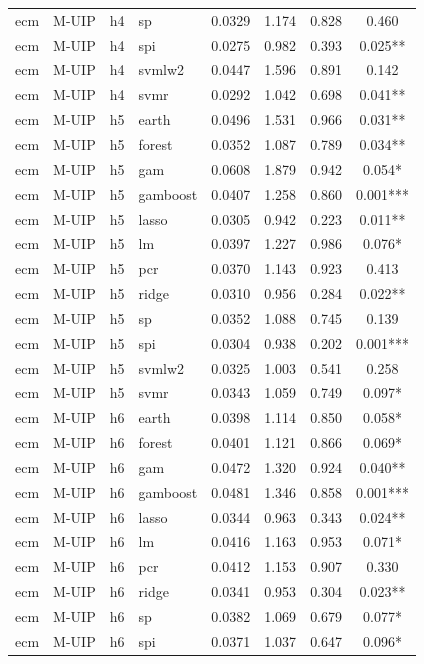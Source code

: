 \begin{ThreePartTable}
\begin{longtable}[t]{llclcccc}
ecm & M-UIP & h4 & sp & 0.0329 & 1.174 & 0.828 & 0.460\\
ecm & M-UIP & h4 & spi & 0.0275 & 0.982 & 0.393 & 0.025**\\
ecm & M-UIP & h4 & svmlw2 & 0.0447 & 1.596 & 0.891 & 0.142\\
ecm & M-UIP & h4 & svmr & 0.0292 & 1.042 & 0.698 & 0.041**\\
\addlinespace
ecm & M-UIP & h5 & earth & 0.0496 & 1.531 & 0.966 & 0.031**\\
ecm & M-UIP & h5 & forest & 0.0352 & 1.087 & 0.789 & 0.034**\\
ecm & M-UIP & h5 & gam & 0.0608 & 1.879 & 0.942 & 0.054*\\
ecm & M-UIP & h5 & gamboost & 0.0407 & 1.258 & 0.860 & 0.001***\\
ecm & M-UIP & h5 & lasso & 0.0305 & 0.942 & 0.223 & 0.011**\\
ecm & M-UIP & h5 & lm & 0.0397 & 1.227 & 0.986 & 0.076*\\
ecm & M-UIP & h5 & pcr & 0.0370 & 1.143 & 0.923 & 0.413\\
ecm & M-UIP & h5 & ridge & 0.0310 & 0.956 & 0.284 & 0.022**\\
ecm & M-UIP & h5 & sp & 0.0352 & 1.088 & 0.745 & 0.139\\
ecm & M-UIP & h5 & spi & 0.0304 & 0.938 & 0.202 & 0.001***\\
ecm & M-UIP & h5 & svmlw2 & 0.0325 & 1.003 & 0.541 & 0.258\\
ecm & M-UIP & h5 & svmr & 0.0343 & 1.059 & 0.749 & 0.097*\\
\addlinespace
ecm & M-UIP & h6 & earth & 0.0398 & 1.114 & 0.850 & 0.058*\\
ecm & M-UIP & h6 & forest & 0.0401 & 1.121 & 0.866 & 0.069*\\
ecm & M-UIP & h6 & gam & 0.0472 & 1.320 & 0.924 & 0.040**\\
ecm & M-UIP & h6 & gamboost & 0.0481 & 1.346 & 0.858 & 0.001***\\
ecm & M-UIP & h6 & lasso & 0.0344 & 0.963 & 0.343 & 0.024**\\
ecm & M-UIP & h6 & lm & 0.0416 & 1.163 & 0.953 & 0.071*\\
ecm & M-UIP & h6 & pcr & 0.0412 & 1.153 & 0.907 & 0.330\\
ecm & M-UIP & h6 & ridge & 0.0341 & 0.953 & 0.304 & 0.023**\\
ecm & M-UIP & h6 & sp & 0.0382 & 1.069 & 0.679 & 0.077*\\
ecm & M-UIP & h6 & spi & 0.0371 & 1.037 & 0.647 & 0.096*\\

\end{longtable}
\end{ThreePartTable}
